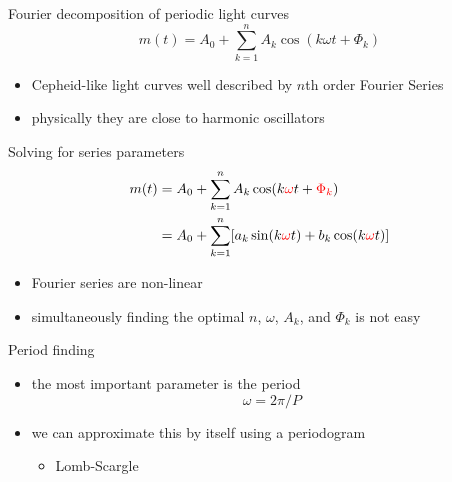 \documentclass{beamer}
\begin{document}
\begin{frame}{Fourier decomposition of periodic light curves}
  \begin{displaymath}
    m(t) = A_0 + \sum_{k=1}^n A_k \cos(k \omega t + \Phi_k)
  \end{displaymath}
  \begin{itemize}
  \item Cepheid-like light curves well described by $n$th order Fourier Series
  \item physically they are close to harmonic oscillators
  \end{itemize}
\end{frame}

\begin{frame}{Solving for series parameters}
  \begin{align*}
    m(t) &=
    A_0 +
    \sum_{k=1}^n A_k \cos(k {\color{red} \omega} t + {\color{red} \Phi_k})
    \\ &=
    A_0 +
    \sum_{k=1}^n [
      a_k \sin(k {\color{red} \omega} t) +
      b_k \cos(k {\color{red} \omega} t)
    ]
  \end{align*}
  \begin{itemize}
  \item Fourier series are non-linear
  \item simultaneously finding the optimal $n$, $\omega$, $A_k$, and $\Phi_k$
    is not easy
  \end{itemize}
\end{frame}

\begin{frame}{Period finding}
  \begin{itemize}
  \item the most important parameter is the period
    \begin{displaymath}
      \omega = 2\pi/P
    \end{displaymath}
  \item we can approximate this by itself using a periodogram
    \begin{itemize}
    \item Lomb-Scargle
    \end{itemize}
  \end{itemize}
\end{frame}
\end{document}

